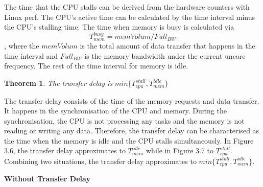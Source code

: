 The time that the CPU stalls can be derived from the hardware counters with Linux perf. The CPU's active time can be calculated by the time interval minus the CPU's stalling time. The time when memory is busy is calculated via
\begin{equation}
T^{busy}_{mem} = memVolum/Full_{BW}
\end{equation}, where the $memVolum$ is the total amount of data transfer that happens in the time interval and $Full_{BW}$ is the memory bandwidth under the current uncore frequency. The rest of the time interval for memory is idle. 


\newtheorem*{theorem*}{Theorem}
\begin{theorem*}
The transfer delay is $min\{T^{stall}_{cpu}, T^{idle}_{mem}\}$
\end{theorem*}


The transfer delay consists of the time of the memory requests and data transfer. It happens in the synchronisation of the CPU and memory. During the synchronisation, the CPU is not processing any tasks and the memory is not reading or writing any data. Therefore, the transfer delay can be characterised as the time when the memory is idle and the CPU stalls simultaneously. In Figure 3.6, the transfer delay approximates to $T^{idle}_{mem}$ while in Figure 3.7 to $T^{stall}_{cpu}$. Combining two situations, the transfer delay approximates to $min\{T^{stall}_{cpu}, T^{idle}_{mem}\}$.



\textbf{Without Transfer Delay}

